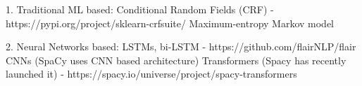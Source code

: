 1. Traditional ML based:
    Conditional Random Fields (CRF) - https://pypi.org/project/sklearn-crfsuite/
    Maximum-entropy Markov model

2. Neural Networks based:
    LSTMs, bi-LSTM - https://github.com/flairNLP/flair
    CNNs (SpaCy uses CNN based architecture)
    Transformers (Spacy has recently launched it) - https://spacy.io/universe/project/spacy-transformers